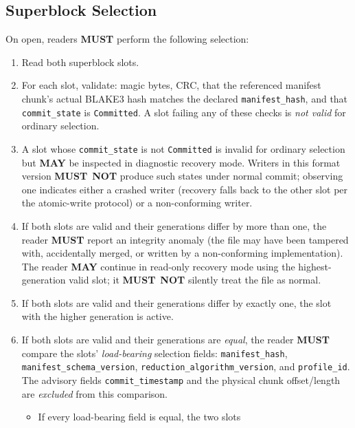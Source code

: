 \documentclass[11pt,letterpaper]{report}
\newcounter{requirement}[chapter]
\newcommand{\MUST}{\textbf{MUST}}
\newcommand{\MUSTNOT}{\textbf{MUST}\nobreak\ \textbf{NOT}}
\newcommand{\MAY}{\textbf{MAY}}
\begin{document}
\subsection{Superblock Selection}

\begin{requirement}
  \label{req:format:superblock-selection}
  On open, readers \MUST{} perform the following selection:

  \begin{enumerate}
    \item Read both superblock slots.
    \item For each slot, validate: magic bytes, CRC, that the
      referenced manifest chunk's actual BLAKE3 hash matches the
      declared \texttt{manifest\_hash}, and that
      \texttt{commit\_state} is \texttt{Committed}. A slot
      failing any of these checks is \emph{not valid} for
      ordinary selection.
    \item A slot whose \texttt{commit\_state} is not
      \texttt{Committed} is invalid for ordinary selection but
      \MAY{} be inspected in diagnostic recovery mode. Writers
      in this format version \MUSTNOT{} produce such states
      under normal commit; observing one indicates either a
      crashed writer (recovery falls back to the other slot per
      the atomic-write protocol) or a non-conforming writer.
    \item If both slots are valid and their generations differ by
      more than one, the reader \MUST{} report an integrity anomaly
      (the file may have been tampered with, accidentally merged,
      or written by a non-conforming implementation). The reader
      \MAY{} continue in read-only recovery mode using the
      highest-generation valid slot; it \MUSTNOT{} silently treat
      the file as normal.
    \item If both slots are valid and their generations differ by
      exactly one, the slot with the higher generation is active.
    \item If both slots are valid and their generations are
      \emph{equal}, the reader \MUST{} compare the slots'
      \emph{load-bearing} selection fields:
      \texttt{manifest\_hash}, \texttt{manifest\_schema\_version},
      \texttt{reduction\_algorithm\_version}, and
      \texttt{profile\_id}. The advisory fields
      \texttt{commit\_timestamp} and the physical chunk
      offset/length are \emph{excluded} from this comparison.
      \begin{itemize}
        \item If every load-bearing field is equal, the two slots

\end{itemize}
\end{enumerate}
\end{requirement}
\end{document}
